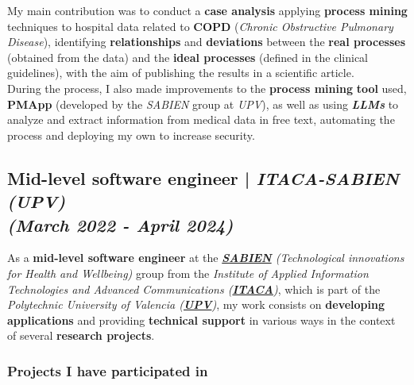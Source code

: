 \documentclass[letterpaper, 12pt, dvipsnames]{article}
\newcommand{\upvName}{Polytechnic University of Valencia}
\newcommand{\upv}{UPV}
\newcommand{\upvUrl}{https://www.upv.es/en}
\newcommand{\sabien}{SABIEN}
\newcommand{\itacaSabien}{ITACA-SABIEN}
\newcommand{\itacaSabienUpv}{{\itacaSabien} (\upv)}
\newcommand{\sabienUrl}{http://www.sabien.upv.es/en/}
\begin{document}
My main contribution was to conduct a \textbf{case analysis} applying \textbf{process mining} techniques to hospital data related to \textbf{COPD} (\emph{Chronic Obstructive Pulmonary Disease}), identifying \textbf{relationships} and \textbf{deviations} between the \textbf{real processes} (obtained from the data) and the \textbf{ideal processes} (defined in the clinical guidelines), with the aim of publishing the results in a scientific article.\\

During the process, I also made improvements to the \textbf{process mining} \textbf{tool} used, \textbf{PMApp} (developed by the \emph{\sabien} group at \emph{\upv}), as well as using \textbf{\emph{LLMs}} to analyze and extract information from medical data in free text, automating the process and deploying my own to increase security.

\subsection*{Mid-level software engineer | \emph{\itacaSabienUpv}\\\textit{\large (March 2022 - April 2024)}}

As a \textbf{mid-level software engineer} at the \emph{\textbf{\href{\sabienUrl}{SABIEN}} (Technological innovations for Health and Wellbeing)} group from the \emph{Institute of Applied Information Technologies and Advanced Communications (\textbf{\href{http://www.itaca.upv.es/}{ITACA}})}, which is part of the \emph{{\upvName} (\textbf{\href{\upvUrl}{\upv}})}, my work consists on \textbf{developing applications} and providing \textbf{technical support} in various ways in the context of several \textbf{research projects}.

\subsubsection*{Projects I have participated in}

\vspace{1em}
\end{document}
